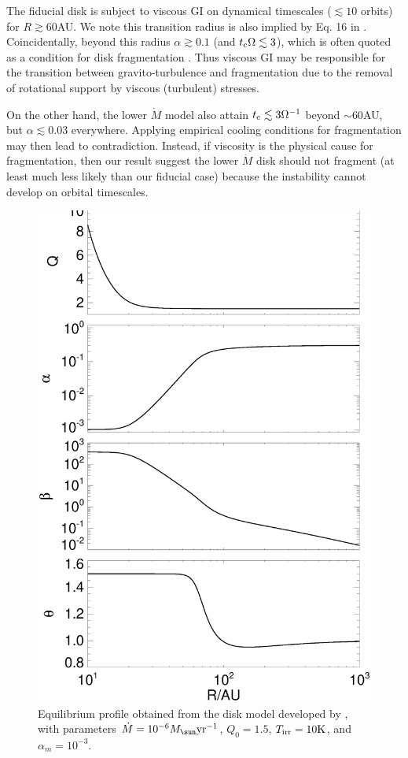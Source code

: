 The fiducial disk is subject to viscous GI on dynamical timescales
($\lesssim 10$ orbits) for $R\gtrsim60$AU. We note this transition
radius is also implied by Eq. 16 in \cite{kratter10}. Coincidentally,
beyond this radius $\alpha\gtrsim 0.1$ (and 
$t_\mathrm{c}\Omega\lesssim 3$), which is often quoted as a condition for disk
fragmentation   
. Thus viscous GI may be responsible for 
the transition between gravito-turbulence and fragmentation due to the
removal of rotational support by viscous (turbulent) stresses. 

On the other hand, the lower $\dot{M}$ model also attain $t_\mathrm{c}\lesssim
3\Omega^{-1}$ beyond $\sim 60$AU, but $\alpha\lesssim 0.03$
everywhere. 
Applying empirical cooling conditions for fragmentation may then lead to
contradiction. Instead, if viscosity is the physical cause for
fragmentation, then our result suggest the lower $\dot{M}$ disk should
not fragment (at least much less likely than our fiducial case) 
because the instability cannot develop on orbital timescales. 

\begin{figure}
  \includegraphics[width=\linewidth,clip=true,trim=0cm 0cm 0cm
    0.0cm]{figures/ppd_2d_basic}
  \caption{Equilibrium profile obtained from the disk model developed
    by \cite{rafikov15}, with parameters $\dot{M} =
    10^{-6}M_\sun\yr^{-1}$, $Q_0=1.5$, $T_\mathrm{irr}=10\mathrm{K}$, and
    $\alpha_m=10^{-3}$.   
    \label{rafikov_model}}
\end{figure}

